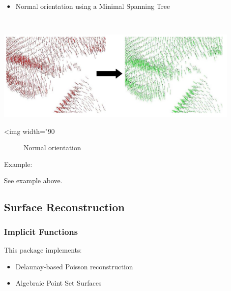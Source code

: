 \begin{itemize}
\item Normal orientation using a Minimal Spanning Tree \cite{cgal:hddms-srup-92}
\end{itemize}

  \\

\begin{center}
    \label{Surface_reconstruction_3-fig-mst_normal_orientation}
    \begin{ccTexOnly}
        \includegraphics[width=0.9\textwidth]{Surface_reconstruction_3/mst_normal_orientation} %
    \end{ccTexOnly}
    \begin{ccHtmlOnly}
        <img width="90%
    \end{ccHtmlOnly}
    \begin{figure}[h]
        \caption{Normal orientation}
    \end{figure}
\end{center}

Example:

See  example above.


\subsection{Surface Reconstruction}

\subsubsection{Implicit Functions}

This package implements:

\begin{itemize}
\item Delaunay-based Poisson reconstruction \cite{Kazhdan06}
\item Algebraic Point Set Surfaces \cite{Guennebaud07}
\end{itemize}

